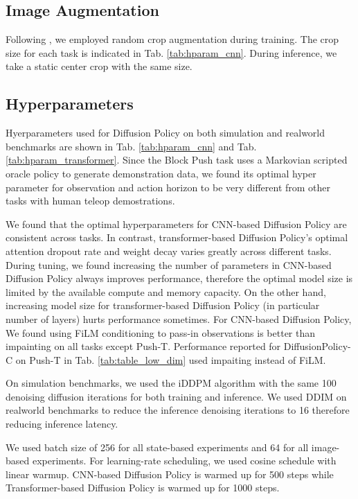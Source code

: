 \documentclass[Afour,sageh,times]{sagej}
\begin{document}
\subsection{Image Augmentation}
Following \citet{robomimic}, we employed random crop augmentation during training. The crop size for each task is indicated in Tab. \ref{tab:hparam_cnn}. During inference, we take a static center crop with the same size.

\subsection{Hyperparameters}
Hyerparameters used for Diffusion Policy on both simulation and realworld benchmarks are shown in Tab. \ref{tab:hparam_cnn} and Tab. \ref{tab:hparam_transformer}. Since the Block Push task uses a Markovian scripted oracle policy to generate demonstration data, we found its optimal hyper parameter for observation and action horizon to be very different from other tasks with human teleop demostrations.

We found that the optimal hyperparameters for CNN-based Diffusion Policy are consistent across tasks. In contrast, transformer-based Diffusion Policy's optimal attention dropout rate and weight decay varies greatly across different tasks. During tuning, we found increasing the number of parameters in CNN-based Diffusion Policy always improves performance, therefore the optimal model size is limited by the available compute and memory capacity. On the other hand, increasing model size for transformer-based Diffusion Policy (in particular number of layers) hurts performance sometimes. For CNN-based Diffusion Policy, We found using FiLM conditioning to pass-in observations is better than impainting on all tasks except Push-T. Performance reported for DiffusionPolicy-C on Push-T in Tab. \ref{tab:table_low_dim} used impaiting instead of FiLM.

On simulation benchmarks, we used the iDDPM algorithm \cite{nichol2021improved} with the same 100 denoising diffusion iterations for both training and inference. We used DDIM \cite{song2021ddim} on realworld benchmarks to reduce the inference denoising iterations to 16 therefore reducing inference latency.

We used batch size of 256 for all state-based experiments and 64 for all image-based experiments. For learning-rate scheduling, we used cosine schedule with linear warmup. CNN-based Diffusion Policy is warmed up for 500 steps while Transformer-based Diffusion Policy is warmed up for 1000 steps.
\end{document}
